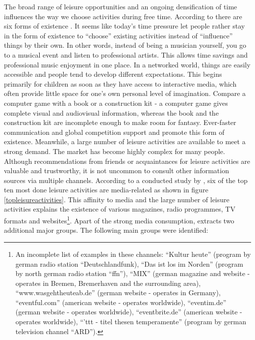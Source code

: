 \documentclass[12pt,numbers=noenddot,parskip,bibliography=totocnumbered,listof=totocnumbered]{scrreprt}
\begin{document}
The broad range of leisure opportunities and an ongoing densification of time influences the way we choose activities during free time. According to \citeauthor{schulze2005} there are six forms of existence \citep[p.198-206]{schulze2005}. It seems like today's time pressure let people rather stay in the form of existence to ``choose'' existing activities instead of ``influence'' things by their own. In other words, instead of being a musician yourself, you go to a musical event and listen to professional artists. This allows time savings and professional music enjoyment in one place. In a networked world, things are easily accessible and people tend to develop different expectations. This begins primarily for children as soon as they have access to interactive media, which often provide little space for one's own personal level of imagination. Compare a computer game with a book or a construction kit - a computer game gives complete visual and audiovisual information, whereas the book and the construction kit are incomplete enough to make room for fantasy. Ever-faster communication and global competition support and promote this form of existence. Meanwhile, a large number of leisure activities are available to meet a strong demand. The market has become highly complex for many people. Although recommendations from friends or acquaintances for leisure activities are valuable and trustworthy, it is not uncommon to consult other information sources via multiple channels. According to a conducted study by \citeauthor{freizeitmonitor2016}, six of the top ten most done leisure activities are media-related as shown in figure \ref{topleisureactivities}. This affinity to media and the large number of leisure activities explains the existence of various magazines, radio programmes, TV formats and websites\footnote{An incomplete list of examples in these channels: ``Kultur heute'' (program by german radio station ``Deutschlandfunk), ``Das ist los im Norden'' (program by north german radio station ``ffn''), ``MIX'' (german magazine and website - operates in Bremen, Bremerhaven and the surrounding area), ``www.wasgehtheuteab.de'' (german website - operates in Germany), ``eventful.com'' (american website - operates worldwide), ``eventim.de'' (german website - operates worldwide), ``eventbrite.de'' (american website - operates worldwide), ``'ttt - titel thesen temperamente'' (program by german television channel ``ARD'').}. Apart of the strong media consumption, \citeauthor{freizeitmonitor2016} extracts two additional major groups. The following main groups were identified:
\end{document}
